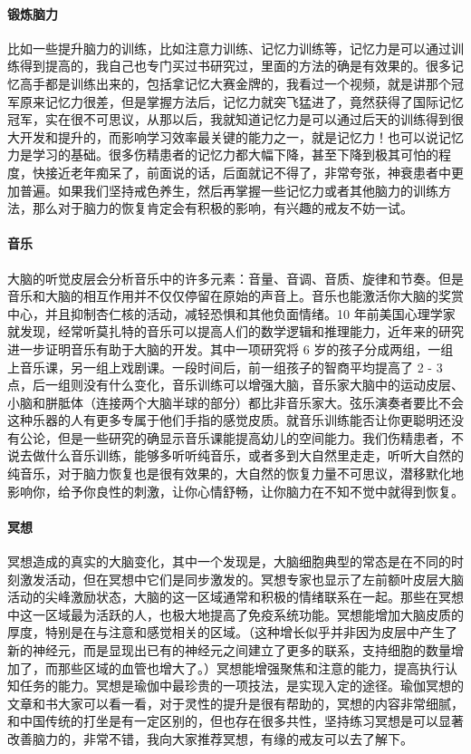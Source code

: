 \paragraph{锻炼脑力} 比如一些提升脑力的训练，比如注意力训练、记忆力训练等，记忆力是可以通过训练得到提高的，我自己也专门买过书研究过，里面的方法的确是有效果的。很多记忆高手都是训练出来的，包括拿记忆大赛金牌的，我看过一个视频，就是讲那个冠军原来记忆力很差，但是掌握方法后，记忆力就突飞猛进了，竟然获得了国际记忆冠军，实在很不可思议，从那以后，我就知道记忆力是可以通过后天的训练得到很大开发和提升的，而影响学习效率最关键的能力之一，就是记忆力！也可以说记忆力是学习的基础。很多伤精患者的记忆力都大幅下降，甚至下降到极其可怕的程度，快接近老年痴呆了，前面说的话，后面就记不得了，非常夸张，神衰患者中更加普遍。如果我们坚持戒色养生，然后再掌握一些记忆力或者其他脑力的训练方法，那么对于脑力的恢复肯定会有积极的影响，有兴趣的戒友不妨一试。

\paragraph{音乐} 大脑的听觉皮层会分析音乐中的许多元素：音量、音调、音质、旋律和节奏。但是音乐和大脑的相互作用并不仅仅停留在原始的声音上。音乐也能激活你大脑的奖赏中心，并且抑制杏仁核的活动，减轻恐惧和其他负面情绪。10 年前美国心理学家就发现，经常听莫扎特的音乐可以提高人们的数学逻辑和推理能力，近年来的研究进一步证明音乐有助于大脑的开发。其中一项研究将 6 岁的孩子分成两组，一组上音乐课，另一组上戏剧课。一段时间后，前一组孩子的智商平均提高了 2 - 3 点，后一组则没有什么变化，音乐训练可以增强大脑，音乐家大脑中的运动皮层、小脑和胼胝体（连接两个大脑半球的部分）都比非音乐家大。弦乐演奏者要比不会这种乐器的人有更多专属于他们手指的感觉皮质。就音乐训练能否让你更聪明还没有公论，但是一些研究的确显示音乐课能提高幼儿的空间能力。我们伤精患者，不说去做什么音乐训练，能够多听听纯音乐，或者多到大自然里走走，听听大自然的纯音乐，对于脑力恢复也是很有效果的，大自然的恢复力量不可思议，潜移默化地影响你，给予你良性的刺激，让你心情舒畅，让你脑力在不知不觉中就得到恢复。

\paragraph{冥想} 冥想造成的真实的大脑变化，其中一个发现是，大脑细胞典型的常态是在不同的时刻激发活动，但在冥想中它们是同步激发的。冥想专家也显示了左前额叶皮层大脑活动的尖峰激励状态，大脑的这一区域通常和积极的情绪联系在一起。那些在冥想中这一区域最为活跃的人，也极大地提高了免疫系统功能。冥想能增加大脑皮质的厚度，特别是在与注意和感觉相关的区域。（这种增长似乎并非因为皮层中产生了新的神经元，而是显现出已有的神经元之间建立了更多的联系，支持细胞的数量增加了，而那些区域的血管也增大了。）冥想能增强聚焦和注意的能力，提高执行认知任务的能力。冥想是瑜伽中最珍贵的一项技法，是实现入定的途径。瑜伽冥想的文章和书大家可以看一看，对于灵性的提升是很有帮助的，冥想的内容非常细腻，和中国传统的打坐是有一定区别的，但也存在很多共性，坚持练习冥想是可以显著改善脑力的，非常不错，我向大家推荐冥想，有缘的戒友可以去了解下。

